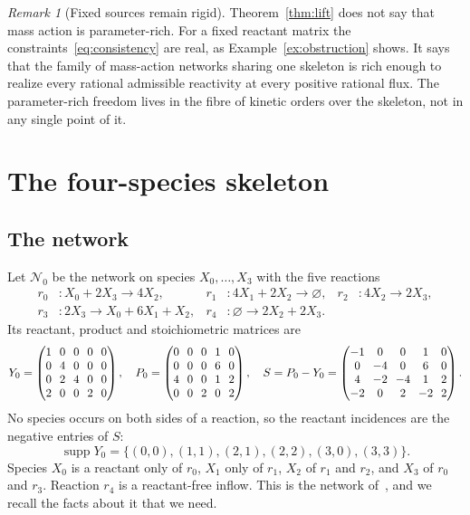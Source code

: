 \documentclass[11pt,a4paper]{article}
\theoremstyle{plain}
\theoremstyle{definition}
\theoremstyle{remark}
\newtheorem{remark}[theorem]{Remark}
\newcommand{\supp}{\operatorname{supp}}
\begin{document}
\begin{remark}[Fixed sources remain rigid]
Theorem~\ref{thm:lift} does not say that mass action is parameter-rich. For a fixed reactant matrix the constraints~\eqref{eq:consistency} are real, as Example~\ref{ex:obstruction} shows. It says that the family of mass-action networks sharing one skeleton is rich enough to realize every rational admissible reactivity at every positive rational flux. The parameter-rich freedom lives in the fibre of kinetic orders over the skeleton, not in any single point of it.
\end{remark}

\section{The four-species skeleton}\label{sec:skeleton}

\subsection{The network}

Let $\mathcal N_0$ be the network on species $X_0,\dots,X_3$ with the five reactions
\begin{equation}\label{eq:reactions}
\begin{aligned}
  r_0&\colon X_0+2X_3\longrightarrow 4X_2, &
  r_1&\colon 4X_1+2X_2\longrightarrow \varnothing, &
  r_2&\colon 4X_2\longrightarrow 2X_3,\\
  r_3&\colon 2X_3\longrightarrow X_0+6X_1+X_2, &
  r_4&\colon \varnothing\longrightarrow 2X_2+2X_3 .
\end{aligned}
\end{equation}
Its reactant, product and stoichiometric matrices are
\begin{equation}\label{eq:matrices}
\setlength{\arraycolsep}{3.5pt}
Y_0=\begin{pmatrix}1&0&0&0&0\\0&4&0&0&0\\0&2&4&0&0\\2&0&0&2&0\end{pmatrix},\quad
P_0=\begin{pmatrix}0&0&0&1&0\\0&0&0&6&0\\4&0&0&1&2\\0&0&2&0&2\end{pmatrix},\quad
S=P_0-Y_0=\begin{pmatrix}-1&0&0&1&0\\0&-4&0&6&0\\4&-2&-4&1&2\\-2&0&2&-2&2\end{pmatrix}.
\end{equation}
No species occurs on both sides of a reaction, so the reactant incidences are the negative entries of $S$:
\begin{equation}\label{eq:support}
  \supp Y_0=\{(0,0),(1,1),(2,1),(2,2),(3,0),(3,3)\}.
\end{equation}
Species $X_0$ is a reactant only of $r_0$, $X_1$ only of $r_1$, $X_2$ of $r_1$ and $r_2$, and $X_3$ of $r_0$ and $r_3$. Reaction $r_4$ is a reactant-free inflow. This is the network of~\cite{Companion2026}, and we recall the facts about it that we need.
\end{document}
